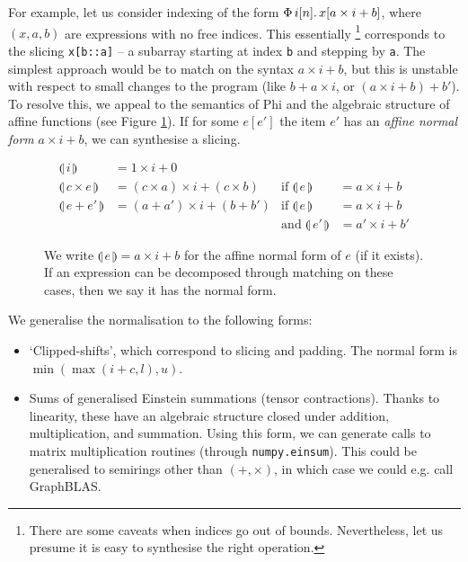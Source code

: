 For example, let us consider indexing of the form $\Phi\, {i}[{n}] \ldotp {x[a \times i + b]}$, where $(x, a, b)$ are expressions with no free indices. This essentially%
\footnote{
There are some caveats when indices go out of bounds. Nevertheless, let us presume it is easy to synthesise the right operation.}
corresponds to the slicing \texttt{x[b::a]} -- a subarray starting at index \texttt{b} and stepping by \texttt{a}.
The simplest approach would be to match on the syntax $a \times i + b$, but this is unstable with respect to small changes to the program (like $b + a \times i$, or $(a \times i + b) + b'$).
To resolve this, we appeal to the semantics of Phi and the algebraic structure of affine functions (see Figure \ref{fig:affine-normal-forms}). 
If for some $e[e']$ the item $e'$ has an \textit{affine normal form} $a \times i + b$, we can synthesise a slicing.

\newcommand{\norma}[1]{\llparenthesis \,{#1}\, \rrparenthesis}
\begin{figure}
    \centering
\begin{align*}
\norma{i} &= 1 \times i + 0 \\
\norma{c\times e} &= (c \times a) \times i + (c \times b)
& \text{if } \norma{e} &= a \times i + b \\
\norma{e + e'} &= (a + a') \times i + (b + b')
& \text{if } \norma{e} &= a \times i + b \\
&& \text{and } \norma{e'} &= a' \times i + b'
\end{align*}
    \caption{We write $\norma{e} = a \times i + b$ for the affine normal form of $e$ (if it exists). If an expression can be decomposed through matching on these cases, then we say it has the normal form.}
    \label{fig:affine-normal-forms}
\end{figure}

We generalise the normalisation to the following forms: \begin{itemize}
    \item `Clipped-shifts', which correspond to slicing and padding. The normal form is $\min(\max(i + c, l), u)$.
    \item Sums of generalised Einstein summations (tensor contractions). Thanks to linearity, these have an algebraic structure closed under addition, multiplication, and summation. Using this form, we can generate calls to matrix multiplication routines (through \texttt{numpy.einsum}). This could be generalised to semirings other than $(+, \times)$, in which case we could e.g. call GraphBLAS.
\end{itemize}


